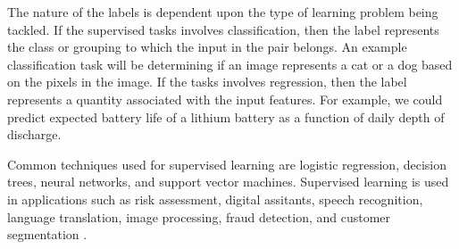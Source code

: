 \documentclass[12pt]{report}
\begin{document}
	The nature of the labels is dependent upon the type of learning problem being tackled.
	If the supervised tasks involves classification, then the label represents 
	the class or grouping to which the input in the pair belongs. An example classification task will be determining if an image represents a cat or a dog based on the pixels in the image. If the tasks involves regression, then the label represents a quantity associated with the input features. For example, we 
	could predict expected battery life of a lithium battery  as a function of daily depth of discharge.  
	
	
	
	
	Common techniques used for supervised learning are logistic regression, decision trees, neural networks, and support vector machines.
	Supervised learning is used in applications such as risk assessment, digital assitants, speech recognition, language translation, 
	image processing, fraud detection, and  customer segmentation \cite{Nevala2017}.
	
\end{document}
